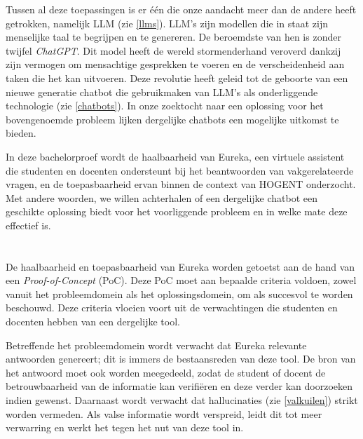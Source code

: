 Tussen al deze toepassingen is er één die onze aandacht meer dan de andere heeft getrokken, namelijk \acrfull{LLM} (zie \ref{llms}). \acrshort{LLM}'s zijn modellen die in staat zijn menselijke taal te begrijpen en te genereren. De beroemdste van hen is zonder twijfel \textit{ChatGPT}. Dit model heeft de wereld stormenderhand veroverd dankzij zijn vermogen om mensachtige gesprekken te voeren en de verscheidenheid aan taken die het kan uitvoeren. Deze revolutie heeft geleid tot de geboorte van een nieuwe generatie chatbot die gebruikmaken van \acrshort{LLM}'s als onderliggende technologie (zie \ref{chatbots}). In onze zoektocht naar een oplossing voor het bovengenoemde probleem lijken dergelijke chatbots een mogelijke uitkomst te bieden.

In deze bachelorproef wordt de haalbaarheid van Eureka, een virtuele assistent die studenten en docenten ondersteunt bij het beantwoorden van vakgerelateerde vragen, en de toepasbaarheid ervan binnen de context van HOGENT onderzocht. Met andere woorden, we willen achterhalen of een dergelijke chatbot een geschikte oplossing biedt voor het voorliggende probleem en in welke mate deze effectief is.
 
\section{}%
\label{sec:onderzoeksdoelstelling}


De haalbaarheid en toepasbaarheid van Eureka worden getoetst aan de hand van een \textit{Proof-of-Concept} (PoC). Deze PoC moet aan bepaalde criteria voldoen, zowel vanuit het probleemdomein als het oplossingsdomein, om als succesvol te worden beschouwd. Deze criteria vloeien voort uit de verwachtingen die studenten en docenten hebben van een dergelijke tool.

Betreffende het probleemdomein wordt verwacht dat Eureka relevante antwoorden genereert; dit is immers de bestaansreden van deze tool. De bron van het antwoord moet ook worden meegedeeld, zodat de student of docent de betrouwbaarheid van de informatie kan verifiëren en deze verder kan doorzoeken indien gewenst. Daarnaast wordt verwacht dat hallucinaties (zie \ref{valkuilen}) strikt worden vermeden. Als valse informatie wordt verspreid, leidt dit tot meer verwarring en werkt het tegen het nut van deze tool in.

